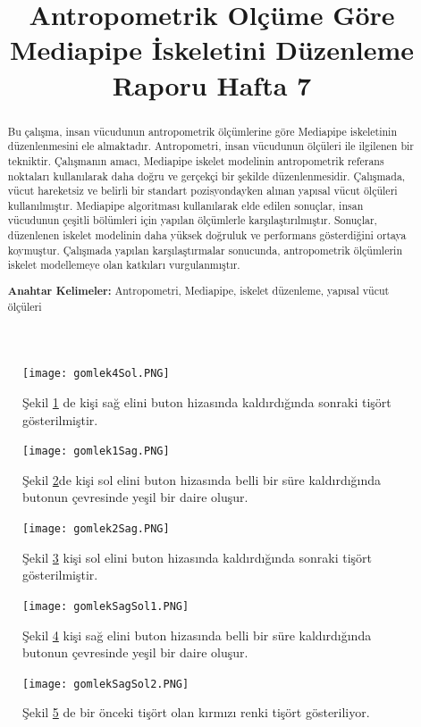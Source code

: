 \documentclass[12pt, a4paper]{article}
\begin{document}
 \begin{figure}[!ht]
 	\caption{}
 	\centering
 	\texttt{[image: gomlek4Sol.PNG]}
 	
 	\label{gomlek4}
 	Şekil \ref{gomlek4} de kişi sağ elini buton hizasında kaldırdığında sonraki tişört gösterilmiştir\cite{TisortPackage}.	
 \end{figure}
 \newpage
 \begin{figure}[!ht]
 	\caption{}
 	\centering
 	\texttt{[image: gomlek1Sag.PNG]}
 	
 	\label{gomlek5}
 	Şekil \ref{gomlek5}de kişi sol elini buton hizasında belli bir süre kaldırdığında butonun çevresinde yeşil bir daire oluşur.\cite{TisortPackage}	
 \end{figure}
 \begin{figure}[!ht]
 	\caption{}
 	\centering
 	\texttt{[image: gomlek2Sag.PNG]}
 	
 	\label{gomlek6}
 	Şekil \ref{gomlek6}  kişi sol elini buton hizasında kaldırdığında sonraki tişört gösterilmiştir\cite{TisortPackage}.	
 \end{figure}
 \begin{figure}[!ht]
 	\caption{}
 	\centering
 	\texttt{[image: gomlekSagSol1.PNG]}
 	
 	\label{gomlek7}
 	Şekil \ref{gomlek7}  kişi sağ elini buton hizasında belli bir süre kaldırdığında butonun çevresinde yeşil bir daire oluşur\cite{TisortPackage}.	
 \end{figure}
 \newpage
 \begin{figure}[!ht]
 	\caption{}
 	\centering
 	\texttt{[image: gomlekSagSol2.PNG]}
 	
 	\label{gomlek8}
 	Şekil \ref{gomlek8} de bir önceki tişört olan kırmızı renki tişört gösteriliyor\cite{TisortPackage}.	
 \end{figure}
 \newpage
 
 
 \title{Antropometrik Olçüme Göre
 	Mediapipe İskeletini Düzenleme
 	Raporu Hafta 7}
 \author{}
 \date{}
 \maketitle
 \setcounter{section}{0}
 \begin{abstract}
 	\begin{justify}
 		Bu çalışma, insan vücudunun antropometrik ölçümlerine göre Mediapipe iskeletinin düzenlenmesini ele almaktadır. Antropometri, insan vücudunun ölçüleri ile ilgilenen bir tekniktir. Çalışmanın amacı, Mediapipe iskelet modelinin antropometrik referans noktaları kullanılarak daha doğru ve gerçekçi bir şekilde düzenlenmesidir. Çalışmada, vücut hareketsiz ve belirli bir standart pozisyondayken alınan yapısal vücut ölçüleri kullanılmıştır. Mediapipe algoritması kullanılarak elde edilen sonuçlar, insan vücudunun çeşitli bölümleri için yapılan ölçümlerle karşılaştırılmıştır. Sonuçlar, düzenlenen iskelet modelinin daha yüksek doğruluk ve performans gösterdiğini ortaya koymuştur. Çalışmada yapılan karşılaştırmalar sonucunda, antropometrik ölçümlerin iskelet modellemeye olan katkıları vurgulanmıştır.
 	\end{justify}
 	\textbf{Anahtar Kelimeler:}  Antropometri, Mediapipe, iskelet düzenleme, yapısal vücut ölçüleri
 	
 	
 \end{abstract}
\end{document}
